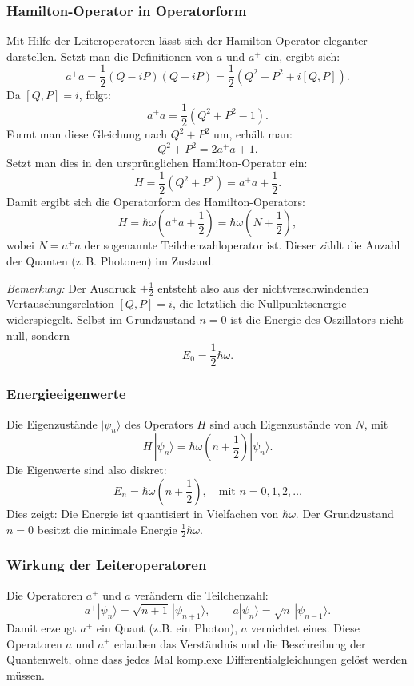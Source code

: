 		\subsubsection{Hamilton-Operator in Operatorform\label{fourier:subsubsection:HamiltonOperatorInOperatorform}}

			Mit Hilfe der Leiteroperatoren lässt sich der Hamilton-Operator eleganter darstellen. Setzt man die Definitionen von $a$ und $a^+$ ein, ergibt sich:
			\[
				a^+a = \frac{1}{2}(Q - iP)(Q + iP) = \frac{1}{2}(Q^2 + P^2 + i[Q, P]).
			\]
			Da $[Q, P] = i$, folgt:
			\[
				a^+a = \frac{1}{2}(Q^2 + P^2 - 1).
			\]
			Formt man diese Gleichung nach $Q^2 + P^2$ um, erhält man:
			\[
				Q^2 + P^2 = 2a^+a + 1.
			\]
			Setzt man dies in den ursprünglichen Hamilton-Operator ein:
			\[
				H = \frac{1}{2}(Q^2 + P^2) = a^+a + \frac{1}{2}.
			\]
			Damit ergibt sich die Operatorform des Hamilton-Operators:
			\begin{equation}
				H = \hbar\omega \left(a^+ a + \frac{1}{2}\right) = \hbar\omega \left(N + \frac{1}{2}\right),
			\end{equation}
			wobei $N = a^+a$ der sogenannte Teilchenzahloperator ist. Dieser zählt die Anzahl der Quanten (z.\,B. Photonen) im Zustand.

			\textit{Bemerkung:}
			Der Ausdruck $+\tfrac{1}{2}$ entsteht also aus der nichtverschwindenden Vertauschungsrelation $[Q,P] = i$, die letztlich die Nullpunktsenergie widerspiegelt. Selbst im Grundzustand $n=0$ ist die Energie des Oszillators nicht null, sondern
			\[
				E_0 = \frac{1}{2}\hbar\omega.
			\]

		\subsubsection{Energieeigenwerte\label{fourier:subsubsection:Energieeigenwerte}}
			Die Eigenzustände $|\psi_n\rangle$ des Operators $H$ sind auch Eigenzustände von $N$, mit
			\begin{equation}
				H\,|\psi_n\rangle = \hbar\omega\left(n + \frac{1}{2}\right) |\psi_n\rangle.
			\end{equation}
			Die Eigenwerte sind also diskret:
			\[
				E_n = \hbar\omega\left(n + \frac{1}{2}\right), \quad \text{mit } n = 0,1,2,\dots
			\]
			Dies zeigt:
			Die Energie ist quantisiert in Vielfachen von $\hbar\omega$.
			Der Grundzustand $n = 0$ besitzt die minimale Energie $\tfrac{1}{2}\hbar\omega$.

		\subsubsection{Wirkung der Leiteroperatoren\label{fourier:subsubsection:WirkungLeiteroperatoren}}
			Die Operatoren $a^+$ und $a$ verändern die Teilchenzahl:
			\[
				a^+|\psi_n\rangle = \sqrt{n+1}\,|\psi_{n+1}\rangle,
				\qquad
				a|\psi_n\rangle = \sqrt{n}\,|\psi_{n-1}\rangle.
			\]
			Damit erzeugt $a^+$ ein Quant (z.B. ein Photon), $a$ vernichtet eines.
			Diese Operatoren $a$ und $a^+$ erlauben das Verständnis und die Beschreibung der Quantenwelt, ohne dass jedes Mal komplexe Differentialgleichungen gelöst werden müssen.

